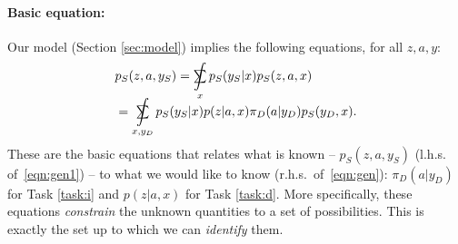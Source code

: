 \documentclass[letterpaper]{article} %
\theoremstyle{definition}%
\theoremstyle{definition}
\newtheorem{assumption}{Assumption} %
\newcommand{\obs}{y}
\newcommand{\Out}{Z}
\newcommand{\out}{z}
\newcommand{\todo}[1]{\textcolor{red}{#1}}
\DeclareMathOperator*{\SumInt}{%
	\mathchoice%
	{\ooalign{$\sum$\cr\hidewidth$\displaystyle\int$\hidewidth\cr}}
	{\ooalign{\raisebox{.14\height}{\scalebox{.7}{$\textstyle\sum$}}\cr\hidewidth$\textstyle\int$\hidewidth\cr}}
	{\ooalign{\raisebox{.2\height}{\scalebox{.6}{$\scriptstyle\sum$}}\cr$\scriptstyle\int$\cr}}
	{\ooalign{\raisebox{.2\height}{\scalebox{.6}{$\scriptstyle\sum$}}\cr$\scriptstyle\int$\cr}}
}
\begin{document}



\paragraph{Basic equation:}
Our model (Section \ref{sec:model}) implies the following equations, for all $\out, a, \obs$:

\begin{align}%
&p_S(\out, a, \obs_S)  = \SumInt_x p_S(\obs_S|x) p_S(z, a, x)  \label{eqn:gen1} \\
&= \SumInt_{x, y_D} p_S(\obs_S|x) p(\out | a, x) \pi_D(a|\obs_D) p_S(\obs_D, x). \label{eqn:gen}
\end{align}
%
These are the basic equations that relates what is known -- $p_S(\out, a, \obs_S)$ (l.h.s. of~\eqref{eqn:gen1}) -- to what we would like to know (r.h.s.\ of~\eqref{eqn:gen}): $\pi_D(a|\obs_D)$ for Task \ref{task:i} and $p(\out | a, x)$ for Task \ref{task:d}.
More specifically, these equations \emph{constrain} the unknown quantities to a set of possibilities.
This is exactly the set up to which we can \emph{identify} \cite{pearl2009causality} them. %

\end{document}
